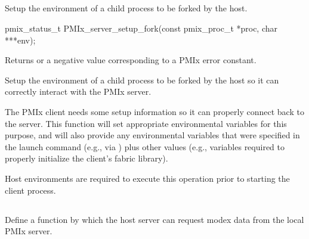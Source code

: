\subsection{}

\summary

Setup the environment of a child process to be forked by the host.

\format

\cspecificstart
\begin{codepar}
pmix_status_t
PMIx_server_setup_fork(const pmix_proc_t *proc,
                        char ***env);
\end{codepar}
\cspecificend

\begin{arglist}
\end{arglist}

Returns  or a negative value corresponding to a PMIx error constant.

\descr

Setup the environment of a child process to be forked by the host so it can correctly interact with the PMIx server.

The \ac{PMIx} client needs some setup information so it can properly connect back to the server.
This function will set appropriate environmental variables for this purpose, and will also provide any environmental variables that were specified in the launch command (e.g., via ) plus other values (e.g., variables required to properly initialize the client's fabric library).

\advicermstart
Host environments are required to execute this operation prior to starting the client process.
\advicermend


\subsection{}

\summary

Define a function by which the host server can request modex data from the local PMIx server.

\format

